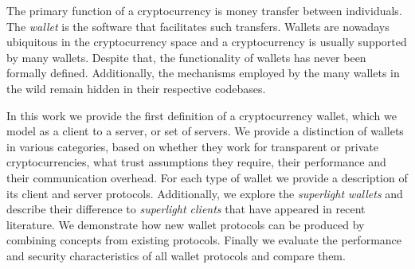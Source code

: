 The primary function of a cryptocurrency is money transfer between individuals. The \emph{wallet} is the software that facilitates such transfers. Wallets are nowadays ubiquitous in the cryptocurrency space and a cryptocurrency is usually supported by many wallets. Despite that, the functionality of wallets has never been formally defined. Additionally, the mechanisms employed by the many wallets in the wild remain hidden in their respective codebases.

In this work we provide the first definition of a cryptocurrency wallet, which we model as a client to a server, or set of servers. We provide a distinction of wallets in various categories, based on whether they work for transparent or private cryptocurrencies, what trust assumptions they require, their performance and their communication overhead. For each type of wallet we provide a description of its client and server protocols. Additionally, we explore the \emph{superlight wallets} and describe their difference to \emph{superlight clients} that have appeared in recent literature. We demonstrate how new wallet protocols can be produced by combining concepts from existing protocols. Finally we evaluate the performance and security characteristics of all wallet protocols and compare them.
